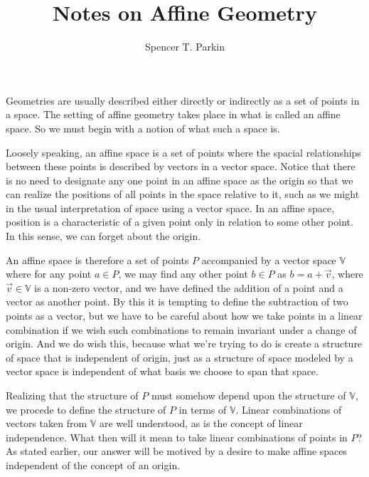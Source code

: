 \documentclass[12pt]{article}
\title{Notes on Affine Geometry}
\author{Spencer T. Parkin}
\newcommand{\V}{\mathbb{V}}
\begin{document}
\maketitle

Geometries are usually described either directly or indirectly
as a set of points in a space.  The setting of affine geometry
takes place in what is called an affine space.  So we must begin
with a notion of what such a space is.

Loosely speaking, an affine space is a set of points where
the spacial relationships between these points is described
by vectors in a vector space.  Notice that there is no need
to designate any one point in an affine space as the origin so
that we can realize the positions of all points in the space
relative to it, such as we might in the usual interpretation
of space using a vector space.
In an affine space, position is a characteristic of a given point only in relation
to some other point.  In this sense, we can forget about the origin.

An affine space is therefore a set of points $P$ accompanied by
a vector space $\V$ where for any point $a\in P$, we may find any
other point $b\in P$ as $b=a+\vec{v}$, where $\vec{v}\in\V$ is
a non-zero vector, and
we have defined the addition of a point and a vector as
another point.  By this it is tempting to define the subtraction
of two points as a vector, but we have to be careful about
how we take points in a linear combination if we wish such
combinations to remain invariant under a change of origin.
And we do wish this, because what we're trying to do is create a structure
of space that is independent of origin, just as a structure of
space modeled by a vector space is independent of what
basis we choose to span that space.

Realizing that the structure of $P$ must somehow depend upon the
structure of $\V$, we procede to define the structure of $P$
in terms of $\V$.  Linear combinations of vectors taken from
$\V$ are well understood, as is the concept of linear independence.
What then will it mean to take linear combinations of points in $P$?
As stated earlier, our answer will be motived by a desire to make
affine spaces independent of the concept of an origin.
\end{document}

